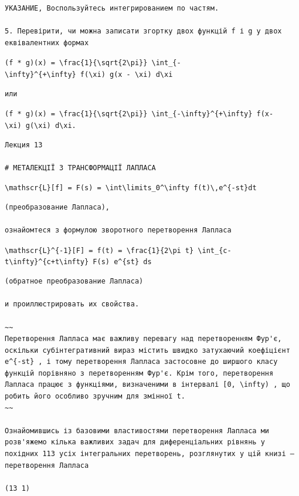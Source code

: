 \documentclass[
  ukrainian,
]{article}
\begin{document}
\begin{verbatim}
УКАЗАНИЕ, Воспользуйтесь интегрированием по частям.

5. Перевірити, чи можна записати згортку двох функцій f і g у двох еквівалентних формах
\end{verbatim}

\texttt{(f\ *\ g)(x)\ =\ \textbackslash{}frac\{1\}\{\textbackslash{}sqrt\{2\textbackslash{}pi\}\}\ \textbackslash{}int\_\{-\textbackslash{}infty\}\^{}\{+\textbackslash{}infty\}\ f(\textbackslash{}xi)\ g(x\ -\ \textbackslash{}xi)\ d\textbackslash{}xi}

\begin{verbatim}
или
\end{verbatim}

\texttt{(f\ *\ g)(x)\ =\ \textbackslash{}frac\{1\}\{\textbackslash{}sqrt\{2\textbackslash{}pi\}\}\ \textbackslash{}int\_\{-\textbackslash{}infty\}\^{}\{+\textbackslash{}infty\}\ f(x-\textbackslash{}xi)\ g(\textbackslash{}xi)\ d\textbackslash{}xi.}

\begin{verbatim}
Лекция 13

# МЕТАЛЕКЦІЇ З ТРАНСФОРМАЦІЇ ЛАПЛАСА
\end{verbatim}

\texttt{\textbackslash{}mathscr\{L\}{[}f{]}\ =\ F(s)\ =\ \textbackslash{}int\textbackslash{}limits\_0\^{}\textbackslash{}infty\ f(t)\textbackslash{},e\^{}\{-st\}dt}

\begin{verbatim}
(преобразование Лапласа),

ознайомтеся з формулою зворотного перетворення Лапласа
\end{verbatim}

\texttt{\textbackslash{}mathscr\{L\}\^{}\{-1\}{[}F{]}\ =\ f(t)\ =\ \textbackslash{}frac\{1\}\{2\textbackslash{}pi\ t\}\ \textbackslash{}int\_\{c-t\textbackslash{}infty\}\^{}\{c+t\textbackslash{}infty\}\ F(s)\ e\^{}\{st\}\ ds}

\begin{verbatim}
(обратное преобразование Лапласа)

и проиллюстрировать их свойства.

~~
Перетворення Лапласа має важливу перевагу над перетворенням Фур'є, оскільки субінтегративний вираз містить швидко затухаючий коефіцієнт e^{-st} , і тому перетворення Лапласа застосовне до ширшого класу функцій порівняно з перетворенням Фур'є. Крім того, перетворення Лапласа працює з функціями, визначеними в інтервалі [0, \infty) , що робить його особливо зручним для змінної t.
~~

Ознайомившись із базовими властивостями перетворення Лапласа ми розв'яжемо кілька важливих задач для диференціальних рівнянь у похідних 113 усіх інтегральних перетворень, розглянутих у цій книзі — перетворення Лапласа

(13 1)
\end{verbatim}
\end{document}
